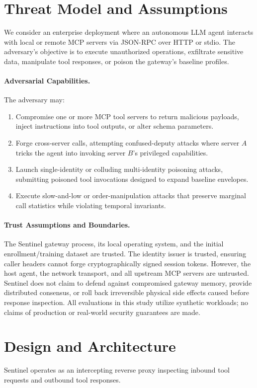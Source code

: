 \documentclass{llncs}
\begin{document}
\section{Threat Model and Assumptions}
\label{sec:threat_model}
We consider an enterprise deployment where an autonomous LLM agent interacts with local or remote MCP servers via JSON-RPC over HTTP or stdio. The adversary's objective is to execute unauthorized operations, exfiltrate sensitive data, manipulate tool responses, or poison the gateway's baseline profiles.

\paragraph{Adversarial Capabilities.} The adversary may:
\begin{enumerate}
    \item Compromise one or more MCP tool servers to return malicious payloads, inject instructions into tool outputs, or alter schema parameters.
    \item Forge cross-server calls, attempting confused-deputy attacks where server $A$ tricks the agent into invoking server $B$'s privileged capabilities.
    \item Launch single-identity or colluding multi-identity poisoning attacks, submitting poisoned tool invocations designed to expand baseline envelopes.
    \item Execute slow-and-low or order-manipulation attacks that preserve marginal call statistics while violating temporal invariants.
\end{enumerate}

\paragraph{Trust Assumptions and Boundaries.} The Sentinel gateway process, its local operating system, and the initial enrollment/training dataset are trusted. The identity issuer is trusted, ensuring caller headers cannot forge cryptographically signed session tokens. However, the host agent, the network transport, and all upstream MCP servers are untrusted. Sentinel does not claim to defend against compromised gateway memory, provide distributed consensus, or roll back irreversible physical side effects caused before response inspection. All evaluations in this study utilize synthetic workloads; no claims of production or real-world security guarantees are made.

\section{Design and Architecture}
\label{sec:design}
Sentinel operates as an intercepting reverse proxy inspecting inbound tool requests and outbound tool responses.
\end{document}
